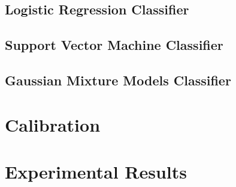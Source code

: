 \documentclass{article}
\begin{document}
    


    \subsection{Logistic Regression Classifier}
    \label{subsec:logisticRegressionClassifier}
    


    \subsection{Support Vector Machine Classifier}
    \label{subsec:supportVectorMachineClassifier}
    



    \subsection{Gaussian Mixture Models Classifier}
    \label{subsec:gaussianMixtureModels}
    



    \section{Calibration}
    \label{sec:calibration}
    


    \section{Experimental Results}
    \label{sec:experimentalResults}
    
\end{document}
